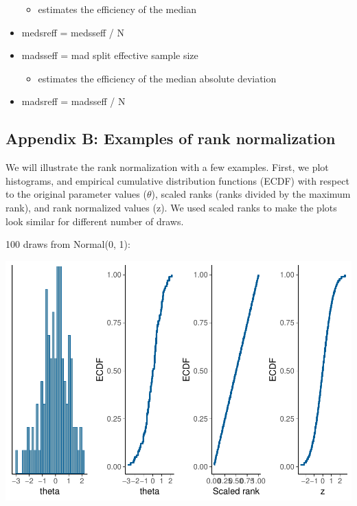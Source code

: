 \documentclass[american,]{article}
\providecommand{\tightlist}{%
  \setlength{\itemsep}{0pt}\setlength{\parskip}{0pt}}
\begin{document}
\begin{itemize}
  \begin{itemize}
  \tightlist
  \item
    estimates the efficiency of the median
  \end{itemize}
\item
  medsreff = medsseff / N
\item
  madsseff = mad split effective sample size

  \begin{itemize}
  \tightlist
  \item
    estimates the efficiency of the median absolute deviation
  \end{itemize}
\item
  madsreff = madsseff / N
\end{itemize}

\hypertarget{AppendixB}{%
\subsection*{Appendix B: Examples of rank
normalization}\label{AppendixB}}

We will illustrate the rank normalization with a few examples. First, we
plot histograms, and empirical cumulative distribution functions (ECDF)
with respect to the original parameter values (\(\theta\)), scaled ranks
(ranks divided by the maximum rank), and rank normalized values (z). We
used scaled ranks to make the plots look similar for different number of
draws.

100 draws from Normal(0, 1):

\includegraphics{graphics/ranknorm-normal-1.pdf}
\end{document}
